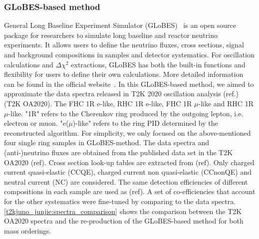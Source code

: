 \subsubsection{GLoBES-based method}
General Long Baseline Experiment Simulator (GLoBES)~\cite{Huber:2004ka} is an open source package for researchers to simulate long baseline and reactor neutrino experiments. It allows users to define the neutrino fluxes, cross sections, signal and background compositions in samples and detector systematics. For oscillation calculations and $\Delta \chi^2$ extractions, GLoBES has both the built-in functions and flexibility for users to define their own calculations. More detailed information can be found in the official website~\cite{Huber:2004ka}.
In this GLoBES-based method, we aimed to approximate the data spectra released in T2K 2020 oscillation analysis (ref.) (T2K OA2020). The FHC 1R e-like, RHC 1R e-like, FHC 1R $\mu$-like and RHC 1R $\mu$-like. "1R" refers to the Cherenkov ring produced by the outgoing lepton, i.e. electron or muon. "e($\mu$)-like" refers to the ring PID determined by the reconstructed algorithm. For simplicity, we only focused on the above-mentioned four single ring samples in GLoBES-method. The data spectra and (anti-)neutrino fluxes are obtained from the published data set in the T2K OA2020 (ref). Cross section look-up tables are extracted from (ref).  Only charged current quasi-elastic (CCQE), charged current non quasi-elastic (CCnonQE) and neutral current (NC) are considered. The same detection efficiencies of different compositions in each sample are used as (ref). A set of co-efficiencies that account for the other systematics were fine-tuned by comparing to the data spectra. \autoref{t2kjuno_junjie:spectra_comparison} shows the comparison between the T2K OA2020 spectra and the re-production of the GLoBES-based method for both mass orderings.

